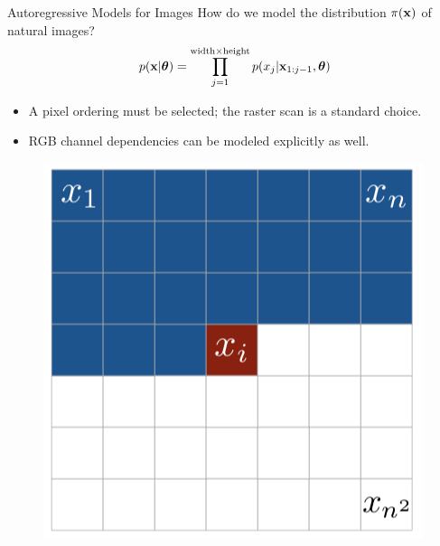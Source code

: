 \documentclass{beamer}
\begin{document}
\begin{frame}{Autoregressive Models for Images}
	How do we model the distribution $\pi(\mathbf{x})$ of natural images?
	$$
  		p(\mathbf{x} | \boldsymbol{\theta}) = \prod_{j=1}^{\text{width} \times \text{height}} p(x_j | \mathbf{x}_{1:j-1}, \boldsymbol{\theta})
	$$
    \eqpause
	\begin{minipage}[t]{0.5\columnwidth}
		\vspace{0.5cm}
		\begin{itemize}
			\item A pixel ordering must be selected; the raster scan is a standard choice.
			\vfill
		    \item RGB channel dependencies can be modeled explicitly as well.
		\end{itemize}
	\end{minipage}%
	\begin{minipage}[t]{0.5\columnwidth}
		\begin{figure}
			\centering
   			\includegraphics[width=0.9\linewidth]{figs/pixelcnn1.png}
		\end{figure}
	\end{minipage}
\end{frame}
\end{document}

